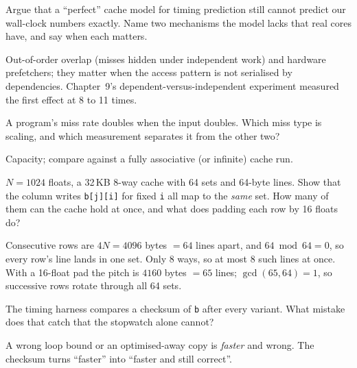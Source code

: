 \begin{exercise}[hard]
Argue that a ``perfect'' cache model for timing prediction still cannot
predict our wall-clock numbers exactly. Name two mechanisms the model
lacks that real cores have, and say when each matters.
\end{exercise}
\begin{solution}[hint]
Out-of-order overlap (misses hidden under independent work) and
hardware prefetchers; they matter when the access pattern is not
serialised by dependencies. Chapter~9's dependent-versus-independent
experiment measured the first effect at 8 to 11 times.
\end{solution}

\begin{exercise}[easy]
A program's miss rate doubles when the input doubles. Which miss type is
scaling, and which measurement separates it from the other two?
\end{exercise}
\begin{solution}[hint]
Capacity; compare against a fully associative (or infinite) cache run.
\end{solution}

\begin{exercise}[medium]
$N{=}1024$ floats, a 32\,KB 8-way cache with 64 sets and 64-byte lines.
Show that the column writes \texttt{b[j][i]} for fixed \texttt{i} all map
to the \emph{same} set. How many of them can the cache hold at once, and
what does padding each row by 16 floats do?
\end{exercise}
\begin{solution}[hint]
Consecutive rows are $4N=4096$ bytes $=64$ lines apart, and $64\bmod64=0$,
so every row's line lands in one set. Only 8 ways, so at most 8 such
lines at once. With a 16-float pad the pitch is $4160$ bytes $=65$ lines;
$\gcd(65,64)=1$, so successive rows rotate through all 64 sets.
\end{solution}

\begin{exercise}[medium]
The timing harness compares a checksum of \texttt{b} after every variant.
What mistake does that catch that the stopwatch alone cannot?
\end{exercise}
\begin{solution}[hint]
A wrong loop bound or an optimised-away copy is \emph{faster} and wrong.
The checksum turns ``faster'' into ``faster and still correct''.
\end{solution}

